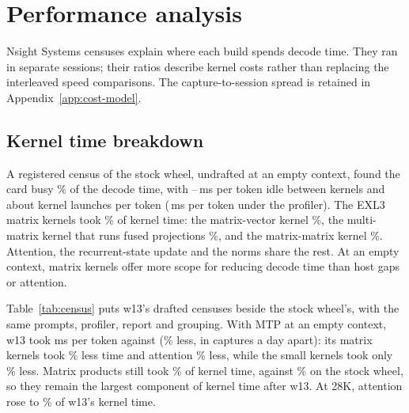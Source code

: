 \documentclass[11pt,letterpaper]{article}
\begin{document}
\section{Performance analysis}
\label{sec:why}
Nsight Systems censuses explain where each build spends decode time.
They ran in separate sessions; their ratios describe kernel costs rather
than replacing the interleaved speed comparisons. The capture-to-session
spread is retained in Appendix~\ref{app:cost-model}.


\subsection{Kernel time breakdown}
\label{sec:census}
A registered census of the stock wheel, undrafted at an empty context, found
the card busy \PeCensusBusy\% of the decode time, with
\PeCensusIdleLo--\PeCensusIdleHi\,ms per token idle between kernels and about
\PeCensusKernels{} kernel launches per token (\PeCensusMs\,ms per token under
the profiler). The EXL3 matrix kernels took \PeCensusMatrix\% of kernel time:
the matrix-vector kernel \PeCensusGemv\%, the multi-matrix kernel that runs
fused projections \PeCensusMgemm\%, and the matrix-matrix kernel
\PeCensusGemm\%. Attention, the recurrent-state update and the norms share the
rest. At an empty context, matrix kernels offer more scope for reducing decode
time than host gaps or attention.

Table~\ref{tab:census} puts w13's drafted censuses beside the stock wheel's,
with the same prompts, profiler, report and grouping. With MTP at an empty
context, w13 took \PeCgWMs{} ms per token against \PeCgStockMtpMs{}
(\PeCgMsCut\% less, in captures a day apart): its matrix kernels took \PeCgMatrixCut\% less time and
attention \PeCgAttnCut\% less, while the small kernels took only
\PeCgSmallCut\% less. Matrix products still took \PeCgWMatrixShare\% of kernel
time, against \PeCgStockMtpMatrixShare\% on the stock wheel, so they remain the
largest component of kernel time after w13. At 28K, attention rose to \PeCgWDeepAttnShare\% of w13's
kernel time.
\end{document}
